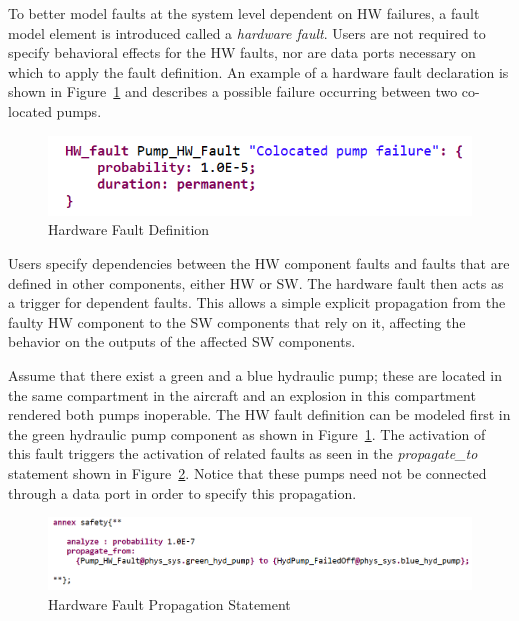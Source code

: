 To better model faults at the system level dependent on HW failures, a fault model element is introduced called a \textit{hardware fault}. Users are not required to specify behavioral effects for the HW faults, nor are data ports necessary on which to apply the fault definition. An example of a hardware fault declaration is shown in Figure~\ref{fig:hwFault} and describes a possible failure occurring between two co-located pumps. 
\begin{figure}[h!]
	\begin{center}
	\includegraphics[width=.6\textwidth]{images/hw_fault2.png}
	\end{center}
	\vspace{-0.1in}
	\caption{Hardware Fault Definition}
	\label{fig:hwFault}
\end{figure}


Users specify dependencies between the HW component faults and faults that are defined in other components, either HW or SW. The hardware fault then acts as a trigger for dependent faults. This allows a simple explicit propagation from the faulty HW component to the SW components that rely on it, affecting the behavior on the outputs of the affected SW components.

Assume that there exist a green and a blue hydraulic pump; these are located in the same compartment in the aircraft and an explosion in this compartment rendered both pumps inoperable. 
The HW fault definition can be modeled first in the green hydraulic pump component as shown in Figure~\ref{fig:hwFault}. The activation of this fault triggers the activation of related faults as seen in the \textit{propagate\_to} statement shown in Figure~\ref{fig:hwFaultProp}. 
Notice that these pumps need not be connected through a data port in order to specify this propagation. 

\begin{figure}[h!]
	\begin{center}
		\includegraphics[width=1.0\textwidth]{images/hw_prop_stmt.png}
	\end{center}
	\vspace{-0.1in}
	\caption{Hardware Fault Propagation Statement}
	\label{fig:hwFaultProp}
\end{figure}

